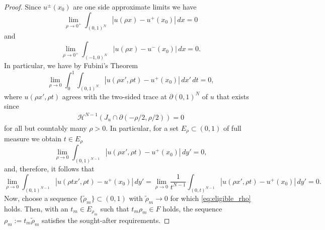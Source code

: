 \documentclass[10pt,a4paper]{amsart}
\renewcommand{\H}{\mathcal H}
\begin{document}
    \begin{proof}
        Since $u^\pm(x_0)$ are one side approximate limits we have 
        \[
            \lim_{\rho \to 0^+} \int_{(0, 1)^N} |u(\rho x) - u^+(x_0)| \, dx = 0
        \]
        and
        \[
            \lim_{\rho \to 0^+} \int_{(-1, 0)^N} |u(\rho x) - u^-(x_0)| \, dx = 0.
        \]
        In particular, we have by Fubini's Theorem
        \[
            \lim_{\rho \to 0} \int_0^1 \int_{(0, 1)^{N}} |u(\rho x', \rho t) - u^+(x_0)| \, dx' \, dt= 0,
        \]
        where $u(\rho x', \rho t)$ agrees with the two-sided trace at $\partial (0,1)^N$ of $u$ that exists since 
        \begin{align}\label{eq:eligible_rho}
            \H^{N-1}(J_u \cap \partial (-\rho/2, \rho/2)) = 0
        \end{align}
        for all but countably many $\rho > 0$. In particular, for a set $E_\rho \subset (0,1)$ of full measure we obtain $t \in E_\rho$
        \[
            \lim_{\rho \to 0} \int_{(0, 1)^{N-1}} |u(\rho x', \rho t) - u^+(x_0)| \, dy' = 0,
        \]
        and, therefore, it follows that 
        \[
            \lim_{\rho \to 0} \int_{(0, 1)^{N-1}} |u(\rho t x', \rho t) - u^+(x_0)| \, dy' = \lim_{\rho \to 0} \frac1 {t^{N-1}} \int_{(0, t)^{N-1}} |u(\rho x', \rho t) - u^+(x_0)| \, dy' = 0.
        \]
        Now, choose a sequence $\{ \tilde \rho_m\} \subset (0,1)$ with $\tilde \rho_m \to 0$ for which \eqref{eq:eligible_rho} holds. Then, with an $t_m \in E_{\rho_m}$ such that $t_m\rho_m \in F$ holds, the sequence $\rho_m := t_m \tilde \rho_m$ satisfies the sought-after requirements.
    \end{proof}
\end{document}
